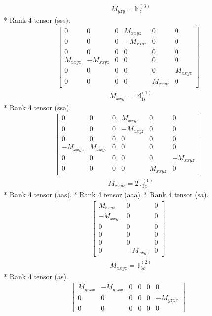 \documentclass[fleqn,8pt,landscape]{jsarticle}
\begin{document}
\begin{align*}
& M_{yzy} = \mathbb{M}_{z}^{(3)}
\end{align*}
* Rank 4 tensor (sss).
\begin{align*}
\begin{bmatrix} 0 & 0 & 0 & M_{xxyz} & 0 & 0 \\ 0 & 0 & 0 & - M_{xxyz} & 0 & 0 \\ 0 & 0 & 0 & 0 & 0 & 0 \\ M_{xxyz} & - M_{xxyz} & 0 & 0 & 0 & 0 \\ 0 & 0 & 0 & 0 & 0 & M_{xxyz} \\ 0 & 0 & 0 & 0 & M_{xxyz} & 0 \end{bmatrix}
\end{align*}
\begin{align*}
& M_{xxyz} = \mathbb{M}_{4s}^{(1)}
\end{align*}
* Rank 4 tensor (ssa).
\begin{align*}
\begin{bmatrix} 0 & 0 & 0 & M_{xxyz} & 0 & 0 \\ 0 & 0 & 0 & - M_{xxyz} & 0 & 0 \\ 0 & 0 & 0 & 0 & 0 & 0 \\ - M_{xxyz} & M_{xxyz} & 0 & 0 & 0 & 0 \\ 0 & 0 & 0 & 0 & 0 & - M_{xxyz} \\ 0 & 0 & 0 & 0 & M_{xxyz} & 0 \end{bmatrix}
\end{align*}
\begin{align*}
& M_{xxyz} = 2 \mathbb{T}_{3c}^{(1)}
\end{align*}
* Rank 4 tensor (aas).
* Rank 4 tensor (aaa).
* Rank 4 tensor (sa).
\begin{align*}
\begin{bmatrix} M_{xxyz} & 0 & 0 \\ - M_{xxyz} & 0 & 0 \\ 0 & 0 & 0 \\ 0 & 0 & 0 \\ 0 & 0 & 0 \\ 0 & - M_{xxyz} & 0 \end{bmatrix}
\end{align*}
\begin{align*}
& M_{xxyz} = \mathbb{T}_{3c}^{(2)}
\end{align*}
* Rank 4 tensor (as).
\begin{align*}
\begin{bmatrix} M_{yzxx} & - M_{yzxx} & 0 & 0 & 0 & 0 \\ 0 & 0 & 0 & 0 & 0 & - M_{yzxx} \\ 0 & 0 & 0 & 0 & 0 & 0 \end{bmatrix}
\end{align*}
\end{document}
